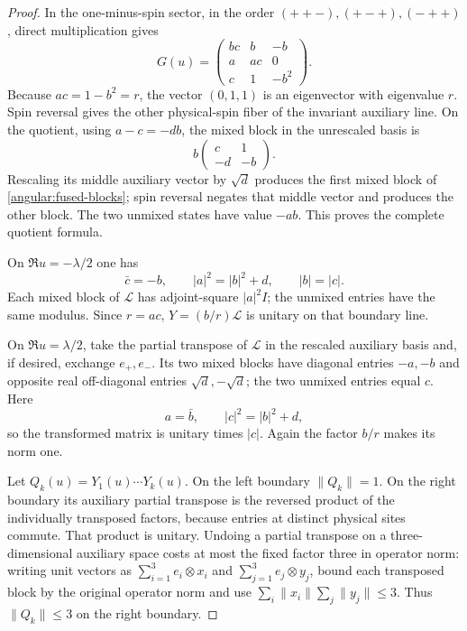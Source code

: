 \begin{proof}
In the one-minus-spin sector, in the order
$(++-),(+-+),(-++)$, direct multiplication gives
\begin{equation}\label{angular:G-three}
 G(u)=
 \begin{pmatrix}
 bc&b&-b\\
 a&ac&0\\
 c&1&-b^2
 \end{pmatrix}.
\end{equation}
Because $ac=1-b^2=r$, the vector $(0,1,1)$ is an eigenvector
with eigenvalue $r$.  Spin reversal gives the other physical-spin
fiber of the invariant auxiliary line.  On the quotient, using
$a-c=-db$, the mixed block in the unrescaled basis is
\[
 b\begin{pmatrix}c&1\\-d&-b\end{pmatrix}.
\]
Rescaling its middle auxiliary vector by $\sqrt d$ produces the
first mixed block of \eqref{angular:fused-blocks}; spin reversal
negates that middle vector and produces the other block.  The two
unmixed states have value $-ab$.  This proves the complete quotient
formula.

On $\Re u=-\lambda/2$ one has
\[
 \bar c=-b,\qquad |a|^2=|b|^2+d,\qquad |b|=|c|.
\]
Each mixed block of $\mathcal L$ has adjoint-square $|a|^2I$;
the unmixed entries have the same modulus.  Since $r=ac$,
$Y=(b/r)\mathcal L$ is unitary on that boundary line.

On $\Re u=\lambda/2$, take the partial transpose of
$\mathcal L$ in the rescaled auxiliary basis and, if desired,
exchange $e_+,e_-$.  Its two mixed blocks have diagonal entries
$-a,-b$ and opposite real off-diagonal entries $\sqrt d,-\sqrt d$;
the two unmixed entries equal $c$.  Here
\[
 a=\bar b,\qquad |c|^2=|b|^2+d,
\]
so the transformed matrix is unitary times $|c|$.  Again the
factor $b/r$ makes its norm one.

Let $Q_k(u)=Y_1(u)\cdots Y_k(u)$.  On the left boundary
$\|Q_k\|=1$.  On the right boundary its auxiliary partial transpose
is the reversed product of the individually transposed factors,
because entries at distinct physical sites commute.  That product
is unitary.  Undoing a partial transpose on a three-dimensional
auxiliary space costs at most the fixed factor three in operator
norm: writing unit vectors as $\sum_{i=1}^3e_i\otimes x_i$ and
$\sum_{j=1}^3e_j\otimes y_j$, bound each transposed block by the
original operator norm and use
$\sum_i\|x_i\|\sum_j\|y_j\|\le3$.
Thus $\|Q_k\|\le3$ on the right boundary.


\end{proof}
